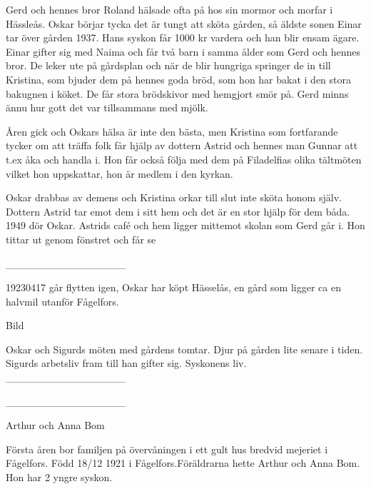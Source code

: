 Gerd och hennes bror Roland hälsade ofta på hos sin mormor och morfar i Hässleås. Oskar börjar tycka det är tungt att sköta gården, så äldste sonen Einar tar över gården 1937. Hans syskon får 1000 kr vardera och han blir ensam ägare. Einar gifter sig med Naima  och får två barn i samma ålder som Gerd och hennes bror. De leker ute på gårdsplan och när de blir hungriga springer de in till Kristina, som bjuder dem på hennes goda bröd, som hon har bakat i den stora bakugnen i köket. De får stora brödskivor med hemgjort smör på. Gerd minns ännu hur gott det var tillsammans med mjölk.


Åren gick och Oskars hälsa är inte den bästa, men Kristina som fortfarande tycker om att träffa folk får hjälp av dottern Astrid och hennes man Gunnar att t.ex åka och handla i. Hon får också följa med dem på Filadelfias olika tältmöten vilket hon uppskattar, hon är medlem i den kyrkan.


Oskar drabbas av demens och Kristina orkar till slut  inte sköta honom själv. Dottern Astrid tar emot dem i sitt hem och det är en stor hjälp för dem båda. 
1949 dör Oskar. Astrids café och hem ligger mittemot skolan som Gerd går i. Hon tittar ut genom fönstret  och får se 








________________






19230417 går flytten igen, Oskar har köpt Hässelås, en gård som ligger ca en halvmil utanför Fågelfors.


Bild


Oskar och Sigurds möten med gårdens tomtar.
Djur på gården lite senare i tiden. Sigurds arbetsliv fram till han gifter sig. Syskonens liv.
________________






________________








Arthur och Anna Bom


Första åren bor familjen på övervåningen i ett gult hus bredvid mejeriet i Fågelfors.
Född 18/12 1921 i Fågelfors.Föräldrarna hette Arthur och Anna Bom. Hon har 2 yngre syskon. 


